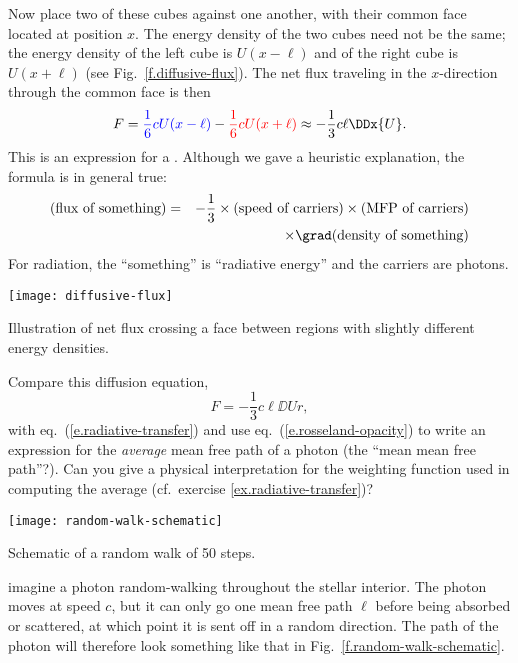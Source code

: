 Now place two of these cubes against one another, with their common face located at position $x$. The energy density of the two cubes need not be the same; the energy density of the left cube is $U(x-\ell)$ and of the right cube is $U(x+\ell)$ (see Fig.~\ref{f.diffusive-flux}). The net flux traveling in the $x$-direction through the common face is then
\[
	F = {\color{blue}\frac{1}{6} c U(x-\ell)} - {\color{red}\frac{1}{6} c U(x+\ell)} \approx -\frac{1}{3}c\ell \DDx{U}.
\]
This is an expression for a . Although we gave a heuristic explanation, the formula is in general true:
\begin{eqnarray}
\nonumber
(\textrm{flux of something}) &=& -\frac{1}{3}\times(\textrm{speed of carriers})\times(\textrm{MFP of carriers})\\
&&\times \grad(\textrm{density of something})
\label{e.diffusive-flux}
\end{eqnarray}
For radiation, the ``something'' is ``radiative energy'' and the carriers are photons.
\begin{marginfigure}[-12\baselineskip]
\texttt{[image: diffusive-flux]}
\caption[Transport along a gradient]{\label{f.diffusive-flux} Illustration of net flux crossing a face between regions with slightly different energy densities.}
\end{marginfigure}

\begin{exercisebox}
Compare this diffusion equation,
\[
	F = -\frac{1}{3}c\ell\DD{U}{r},
\]
with eq.~(\ref{e.radiative-transfer}) and use eq.~(\ref{e.rosseland-opacity}) to write an expression for the \emph{average} mean free path  of a photon (the ``mean mean free path''?). Can you give a physical interpretation for the weighting function used in computing the average (cf.\ exercise \ref{ex.radiative-transfer})?
\end{exercisebox}

\begin{marginfigure}
\texttt{[image: random-walk-schematic]}
\caption[Schematic of a random walk]{\label{f.random-walk-schematic}Schematic of a random walk of 50 steps.}
\end{marginfigure}
 imagine a photon random-walking throughout the stellar interior.
The photon moves at speed $c$, but it can only go one mean free path $\ell$ before being absorbed or scattered, at which point it is sent off in a random direction. The path of the photon will therefore look something like that in Fig.~\ref{f.random-walk-schematic}.

